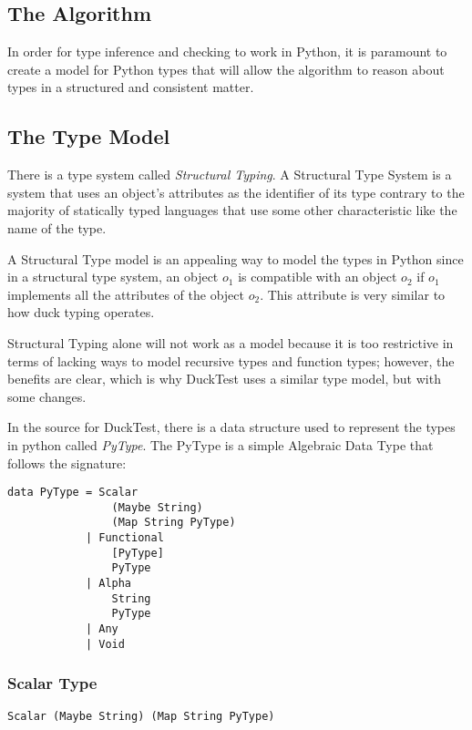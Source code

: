 \documentclass{scrartcl}
\begin{document}
\begin{multicols}{2}
\section*{The Algorithm}

In order for type inference and checking to work in Python, it is paramount
to create a model for Python types that will allow the algorithm to reason
about types in a structured and consistent matter.

\subsection*{The Type Model}

There is a type system called \emph{Structural Typing}. A Structural
Type System is a system that uses an object's attributes as the identifier
of its type contrary to the majority of statically typed languages that
use some other characteristic like the name of the type.

A Structural Type model is an appealing way to model the types in Python
since in a structural type system, an object $o_1$ is compatible with
an object $o_2$ if $o_1$ implements all the attributes of the object $o_2$.
This attribute is very similar to how duck typing operates.

Structural Typing alone will not work as a model because it is too restrictive
in terms of lacking ways to model recursive types and function types; however,
the benefits are clear, which is why DuckTest uses a similar type model,
but with some changes.

In the source for DuckTest, there is a data structure used to represent
the types in python called \emph{PyType}. The PyType is a simple Algebraic
Data Type that follows the signature:

\begin{verbatim}
data PyType = Scalar
                (Maybe String)
                (Map String PyType)
            | Functional
                [PyType]
                PyType
            | Alpha
                String
                PyType
            | Any
            | Void
\end{verbatim}

\subsubsection*{Scalar Type}

\texttt{Scalar (Maybe String) (Map String PyType)}


\end{multicols}
\end{document}

